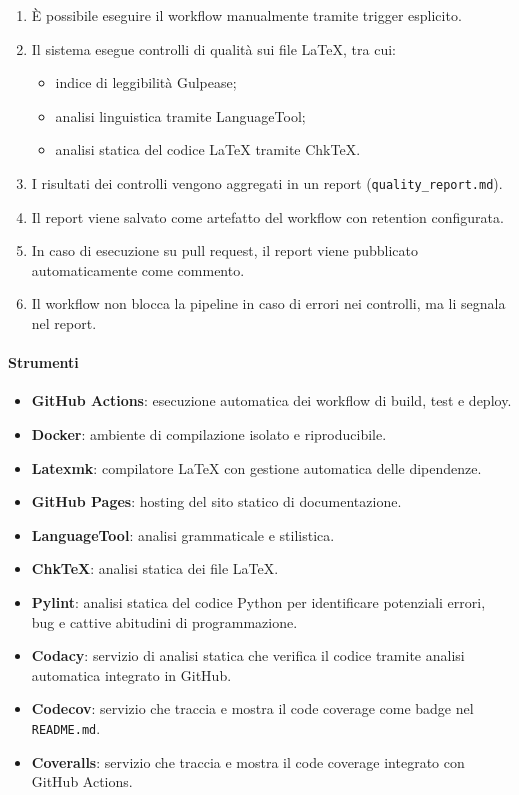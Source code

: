 \documentclass[a4paper, 11pt, oneside]{scrartcl}
\begin{document}
\begin{enumerate}
\begin{enumerate}[label=\alph*.]
              \item È possibile eseguire il workflow manualmente tramite trigger esplicito.
              \item Il sistema esegue controlli di qualità sui file \LaTeX{}, tra cui:
                    \begin{itemize}
                        \item indice di leggibilità Gulpease;
                        \item analisi linguistica tramite LanguageTool;
                        \item analisi statica del codice \LaTeX{} tramite ChkTeX.
                    \end{itemize}
              \item I risultati dei controlli vengono aggregati in un report (\texttt{quality\_report.md}).
              \item Il report viene salvato come artefatto del workflow con retention configurata.
              \item In caso di esecuzione su pull request, il report viene pubblicato automaticamente come commento.
              \item Il workflow non blocca la pipeline in caso di errori nei controlli, ma li segnala nel report.
          \end{enumerate}
\end{enumerate}

\paragraph{Strumenti}
\begin{itemize}
    \item \textbf{GitHub Actions}: esecuzione automatica dei workflow di build, test e deploy.
    \item \textbf{Docker}: ambiente di compilazione isolato e riproducibile.
    \item \textbf{Latexmk}: compilatore \LaTeX{} con gestione automatica delle dipendenze.
    \item \textbf{GitHub Pages}: hosting del sito statico di documentazione.
    \item \textbf{LanguageTool}: analisi grammaticale e stilistica.
    \item \textbf{ChkTeX}: analisi statica dei file \LaTeX{}.
    \item \textbf{Pylint}: analisi statica del codice Python per identificare potenziali errori, bug e cattive abitudini di programmazione.
    \item \textbf{Codacy}: servizio di analisi statica che verifica il codice tramite analisi automatica integrato in GitHub.
    \item \textbf{Codecov}: servizio che traccia e mostra il code coverage come badge nel \texttt{README.md}.
    \item \textbf{Coveralls}: servizio che traccia e mostra il code coverage integrato con GitHub Actions.
\end{itemize}
\end{document}
